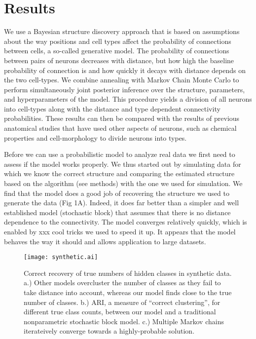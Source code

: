 \documentclass{article}
\begin{document}
\section{Results}
We use a Bayesian structure discovery approach that is based on
assumptions about the way positions and cell types affect the
probability of connections between cells, a so-called generative
model. The probability of connections between pairs of neurons
decreases with distance, but how high the baseline probability of
connection is and how quickly it decays with distance depends on the
two cell-types. We combine annealing with Markov Chain Monte Carlo to
perform simultaneously joint posterior inference over the structure,
parameters, and hyperparameters of the model. This procedure yields a
division of all neurons into cell-types along with the distance and
type dependent connectivity probabilities. These results can then be
compared with the results of previous anatomical studies that have
used other aspects of neurons, such as chemical properties and
cell-morphology to divide neurons into types.

Before we can use a probabilistic model to analyze real data we first
need to assess if the model works properly. We thus started out by
simulating data for which we know the correct structure and comparing
the estimated structure based on the algorithm (see methods) with the
one we used for simulation. We find that the model does a good job of
recovering the structure we used to generate the data (Fig
1A). Indeed, it does far better than a simpler and well established
model (stochastic block) that assumes that there is no distance
dependence to the connectivity. The model converges relatively
quickly, which is enabled by xxx cool tricks we used to speed it
up. It appears that the model behaves the way it should and allows
application to large datasets.

\begin{figure}
  \centering 
  \centerline{\texttt{[image: synthetic.ai]}}
  \caption{Correct recovery of true numbers of hidden classes
in synthetic data. a.) Other models overcluster the number
of classes as they fail to take distance into account, whereas
our model finds close to the true number of classes. b.) ARI, a measure
of ``correct clustering'', for
different true class counts, between our model and a traditional
nonparametric stochastic block model. c.) Multiple Markov chains iterateively
converge towards a highly-probable solution. }

\end{figure}
\end{document}

